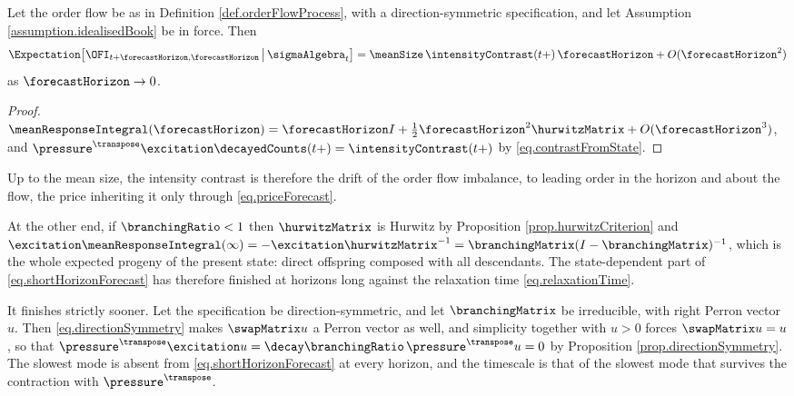 \begin{corol}\label{corol.contrastAsDrift}
 Let the order flow be as in Definition \ref{def.orderFlowProcess},
 with a direction-symmetric specification,
 and let Assumption \ref{assumption.idealisedBook} be in force.
 Then
 \begin{equation}\label{eq.contrastAsDrift}
  \Expectation \big[ \OFI_{t+\forecastHorizon, \forecastHorizon}
  \,\big|\, \sigmaAlgebra_t \big]
  = \meanSize \, \intensityContrast(t+) \, \forecastHorizon
  + O(\forecastHorizon^{2})
 \end{equation}
 as $\forecastHorizon \to 0$.
\end{corol}
\begin{proof}
 $\meanResponseIntegral(\forecastHorizon)
 = \forecastHorizon I + \tfrac{1}{2}\forecastHorizon^{2}\hurwitzMatrix
 + O(\forecastHorizon^{3})$,
 and $\pressure^{\transpose}\excitation\decayedCounts(t+) = \intensityContrast(t+)$ by
 \eqref{eq.contrastFromState}.
\end{proof}

Up to the mean size, the intensity contrast is therefore the drift of the order flow
imbalance, to leading order in the horizon and about the flow,
the price inheriting it only through \eqref{eq.priceForecast}.

\begin{remark}\label{remark.totalResponse}
 At the other end, if $\branchingRatio < 1$ then $\hurwitzMatrix$ is Hurwitz by
 Proposition \ref{prop.hurwitzCriterion} and
 $\excitation \meanResponseIntegral(\infty)
 = -\excitation\hurwitzMatrix^{-1}
 = \branchingMatrix (I - \branchingMatrix)^{-1}$,
 which is the whole expected progeny of the present state:
 direct offspring composed with all descendants.
 The state-dependent part of \eqref{eq.shortHorizonForecast} has therefore finished at
 horizons long against the relaxation time \eqref{eq.relaxationTime}.

 It finishes strictly sooner.
 Let the specification be direction-symmetric,
 and let $\branchingMatrix$ be irreducible, with right Perron vector $u$.
 Then \eqref{eq.directionSymmetry} makes $\swapMatrix u$ a Perron vector as well,
 and simplicity together with $u > 0$ forces $\swapMatrix u = u$, so that
 $\pressure^{\transpose}\excitation u
 = \decay\branchingRatio\,\pressure^{\transpose}u = 0$
 by Proposition \ref{prop.directionSymmetry}.
 The slowest mode is absent from \eqref{eq.shortHorizonForecast} at every horizon,
 and the timescale is that of the slowest mode that survives the contraction with
 $\pressure^{\transpose}$.
\end{remark}

